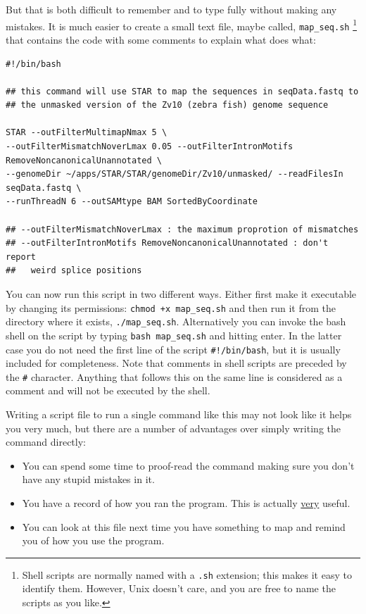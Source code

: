 \documentclass[11pt]{article}
\begin{document}
But that is both difficult to remember and to type fully without
making any mistakes. It is much easier to create a small text file,
maybe called, \texttt{map\_seq.sh} \footnote{Shell scripts are normally named with a \texttt{.sh} extension; this
makes it easy to identify them. However, Unix doesn't care, and you
are free to name the scripts as you like.} that contains the code with some
comments to explain what does what:

\begin{verbatim}
#!/bin/bash

## this command will use STAR to map the sequences in seqData.fastq to
## the unmasked version of the Zv10 (zebra fish) genome sequence

STAR --outFilterMultimapNmax 5 \
--outFilterMismatchNoverLmax 0.05 --outFilterIntronMotifs RemoveNoncanonicalUnannotated \
--genomeDir ~/apps/STAR/STAR/genomeDir/Zv10/unmasked/ --readFilesIn seqData.fastq \
--runThreadN 6 --outSAMtype BAM SortedByCoordinate

## --outFilterMismatchNoverLmax : the maximum proprotion of mismatches
## --outFilterIntronMotifs RemoveNoncanonicalUnannotated : don't report 
##   weird splice positions
\end{verbatim}

You can now run this script in two different ways. Either first make it
executable by changing its permissions: \texttt{chmod +x map\_seq.sh} and then run it
from the directory where it exists, \texttt{./map\_seq.sh}. Alternatively you can
invoke the bash shell on the script by typing \texttt{bash map\_seq.sh} and hitting
enter. In the latter case you do not need the first line of the script
\texttt{\#!/bin/bash}, but it is usually included for completeness. Note that comments
in shell scripts are preceded by the \texttt{\#} character. Anything that follows
this on the same line is considered as a comment and will not be executed by
the shell.

Writing a script file to run a single command like this may not look like it
helps you very much, but there are a number of advantages over simply writing
the command directly:
\begin{itemize}
\item You can spend some time to proof-read the command making sure you don't
have any stupid mistakes in it.
\item You have a record of how you ran the program. This is actually \uline{very}
  useful.
\item You can look at this file next time you have something to map and remind
you of how you use the program.
\end{itemize}
\end{document}
